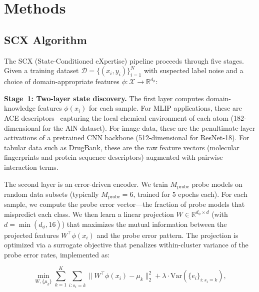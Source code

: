 %

\section{Methods}

\subsection{SCX Algorithm}

The SCX (State-Conditioned eXpertise) pipeline proceeds through five stages. Given a training dataset $\mathcal{D} = \{(x_i, y_i)\}_{i=1}^N$ with suspected label noise and a choice of domain-appropriate features $\phi \colon \mathcal{X} \to \mathbb{R}^{d_\phi}$:

\textbf{Stage~1: Two-layer state discovery.} The first layer computes domain-knowledge features $\phi(x_i)$ for each sample. For MLIP applications, these are ACE descriptors~\cite{drautz2019ace} capturing the local chemical environment of each atom (182-dimensional for the AlN dataset). For image data, these are the penultimate-layer activations of a pretrained CNN backbone (512-dimensional for ResNet-18). For tabular data such as DrugBank, these are the raw feature vectors (molecular fingerprints and protein sequence descriptors) augmented with pairwise interaction terms.

The second layer is an error-driven encoder. We train $M_{\mathrm{probe}}$ probe models on random data subsets (typically $M_{\mathrm{probe}} = 6$, trained for 5 epochs each). For each sample, we compute the probe error vector---the fraction of probe models that mispredict each class. We then learn a linear projection $W \in \mathbb{R}^{d_\phi \times d}$ (with $d = \min(d_\phi, 16)$) that maximizes the mutual information between the projected features $W^\top \phi(x_i)$ and the probe error pattern. The projection is optimized via a surrogate objective that penalizes within-cluster variance of the probe error rates, implemented as:

\begin{equation}
\min_{W, \{\mu_k\}} \sum_{k=1}^K \sum_{i: s_i = k} \bigl\| W^\top \phi(x_i) - \mu_k \bigr\|_2^2 + \lambda \cdot \mathrm{Var}(\{e_i\}_{i: s_i = k}),
\label{eq:encoder}
\end{equation}

